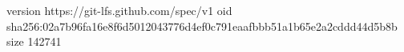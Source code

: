 version https://git-lfs.github.com/spec/v1
oid sha256:02a7b96fa16e8f6d5012043776d4ef0c791eaafbbb51a1b65e2a2cddd44d5b8b
size 142741
